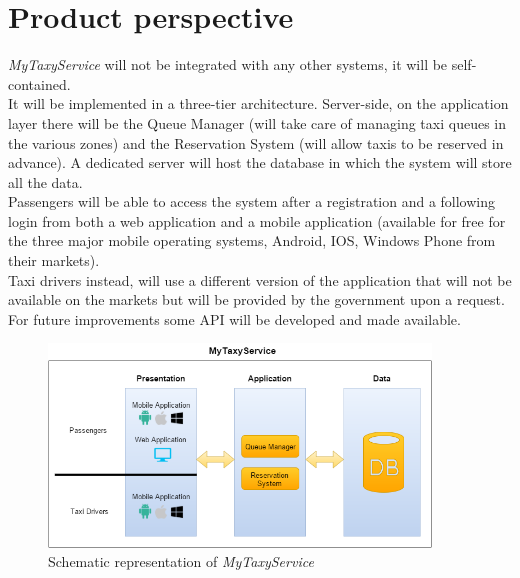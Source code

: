 \section{Product perspective}
\textit{MyTaxyService} will not be integrated with any other systems, it will be self-contained.\\
It will be implemented in a three-tier architecture. Server-side, on the application layer there will be the Queue Manager (will take care of managing taxi queues in the various zones) and the Reservation System (will allow taxis to be reserved in advance). A dedicated server will host the database in which the system will store all the data.\\
Passengers will be able to access the system after a registration and a following login from both a web application and a mobile application (available for free for the three major mobile operating systems, Android, IOS, Windows Phone from their markets).\\
Taxi drivers instead, will use a different version of the application that will not be available on the markets but will be provided by the government upon a request.
For future improvements some API will be developed and made available.

\begin{figure}[h]
	\centering
	\includegraphics[width=4in]{Images/system_diagram}
	\caption{Schematic representation of \textit{MyTaxyService}}
\end{figure}